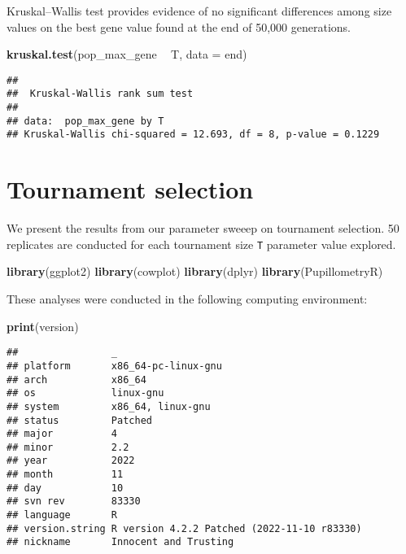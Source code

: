 \documentclass[]{book}
\newenvironment{Shaded}{\begin{snugshade}}{\end{snugshade}}
\newcommand{\DataTypeTok}[1]{\textcolor[rgb]{0.13,0.29,0.53}{#1}}
\newcommand{\KeywordTok}[1]{\textcolor[rgb]{0.13,0.29,0.53}{\textbf{#1}}}
\newcommand{\NormalTok}[1]{#1}
\newcommand{\OperatorTok}[1]{\textcolor[rgb]{0.81,0.36,0.00}{\textbf{#1}}}
\newcommand{\StringTok}[1]{\textcolor[rgb]{0.31,0.60,0.02}{#1}}
\begin{document}
Kruskal--Wallis test provides evidence of no significant differences among size values on the best gene value found at the end of 50,000 generations.

\begin{Shaded}
\begin{Highlighting}[]
\KeywordTok{kruskal.test}\NormalTok{(pop_max_gene }\OperatorTok{~}\StringTok{ }\NormalTok{T, }\DataTypeTok{data =}\NormalTok{ end)}
\end{Highlighting}
\end{Shaded}

\begin{verbatim}
## 
##  Kruskal-Wallis rank sum test
## 
## data:  pop_max_gene by T
## Kruskal-Wallis chi-squared = 12.693, df = 8, p-value = 0.1229
\end{verbatim}

\hypertarget{tournament-selection}{%
\chapter{Tournament selection}\label{tournament-selection}}

We present the results from our parameter sweeep on tournament selection.
50 replicates are conducted for each tournament size \texttt{T} parameter value explored.

\begin{Shaded}
\begin{Highlighting}[]
\KeywordTok{library}\NormalTok{(ggplot2)}
\KeywordTok{library}\NormalTok{(cowplot)}
\KeywordTok{library}\NormalTok{(dplyr)}
\KeywordTok{library}\NormalTok{(PupillometryR)}
\end{Highlighting}
\end{Shaded}

These analyses were conducted in the following computing environment:

\begin{Shaded}
\begin{Highlighting}[]
\KeywordTok{print}\NormalTok{(version)}
\end{Highlighting}
\end{Shaded}

\begin{verbatim}
##                _                                          
## platform       x86_64-pc-linux-gnu                        
## arch           x86_64                                     
## os             linux-gnu                                  
## system         x86_64, linux-gnu                          
## status         Patched                                    
## major          4                                          
## minor          2.2                                        
## year           2022                                       
## month          11                                         
## day            10                                         
## svn rev        83330                                      
## language       R                                          
## version.string R version 4.2.2 Patched (2022-11-10 r83330)
## nickname       Innocent and Trusting
\end{verbatim}
\end{document}
